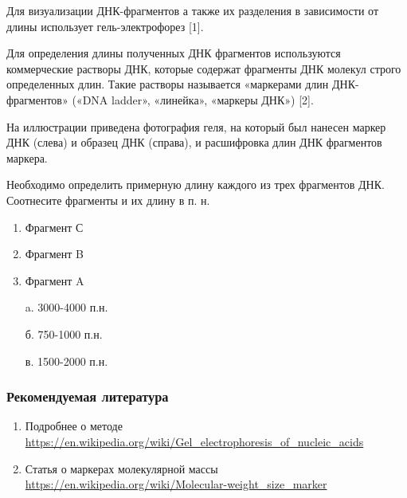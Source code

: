 
Для визуализации ДНК-фрагментов а также их разделения в зависимости от длины использует гель-электрофорез [1].

Для определения длины полученных ДНК фрагментов используются коммерческие растворы ДНК, которые содержат фрагменты ДНК молекул строго определенных длин. Такие растворы называется «маркерами длин ДНК-фрагментов» («DNA ladder», «линейка», «маркеры ДНК») [2].

На иллюстрации приведена фотография геля, на который был нанесен маркер ДНК (слева) и образец ДНК (справа), и расшифровка длин ДНК фрагментов маркера.


Необходимо определить примерную длину каждого из трех фрагментов ДНК. Соотнесите фрагменты и их длину в п. н.

\begin{multicols}{2}
    {
        \begin{enumerate}
            \item Фрагмент С
            \item Фрагмент B
            \item Фрагмент A
        \end{enumerate}
    }
    {
        \begin{enumerate}
            \item[a.] 3000-4000 п.н.
            \item[б.] 750-1000 п.н.
            \item[в.] 1500-2000 п.н.  
        \end{enumerate}
    }
    
\end{multicols}


\subsubsection*{Рекомендуемая литература}

\begin{enumerate}
    \item Подробнее о методе \url{https://en.wikipedia.org/wiki/Gel_electrophoresis_of_nucleic_acids}
    \item Статья о маркерах молекулярной массы \url{https://en.wikipedia.org/wiki/Molecular-weight_size_marker}
\end{enumerate}